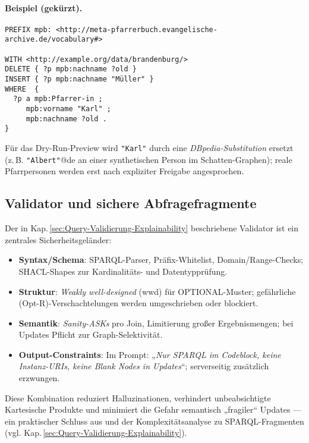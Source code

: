 \paragraph{Beispiel (gekürzt).}
\begin{lstlisting}[language=SPARQL,caption={Graph-selektives Update mit Preview-geeigneter WHERE-Bindung.},label={lst:privacy-update}]
PREFIX mpb: <http://meta-pfarrerbuch.evangelische-archive.de/vocabulary#>

WITH <http://example.org/data/brandenburg/>
DELETE { ?p mpb:nachname ?old }
INSERT { ?p mpb:nachname "Müller" }
WHERE  {
  ?p a mpb:Pfarrer-in ;
     mpb:vorname "Karl" ;
     mpb:nachname ?old .
}
\end{lstlisting}

Für das Dry-Run-Preview wird \texttt{"Karl"} durch eine \emph{DBpedia-Substitution} ersetzt (z.\,B. \texttt{"Albert"}@de an einer synthetischen Person im Schatten-Graphen); reale Pfarrpersonen werden erst nach expliziter Freigabe angesprochen.

\subsection{Validator und sichere Abfragefragmente}
\label{subsec:validator-privacy}

Der in Kap.\,\ref{sec:Query-Validierung-Explainability} beschriebene Validator ist ein zentrales Sicherheitsgeländer:

\begin{itemize}
  \item \textbf{Syntax/Schema}: SPARQL-Parser, Präfix-Whitelist, Domain/Range-Checks; SHACL-Shapes zur Kardinalitäts- und Datentypprüfung.
  \item \textbf{Struktur}: \emph{Weakly well-designed} (wwd) für OPTIONAL-Muster; gefährliche (Opt-R)-Verschachtelungen werden umgeschrieben oder blockiert. 
  \item \textbf{Semantik}: \emph{Sanity-ASKs} pro Join, Limitierung großer Ergebnismengen; bei Updates Pflicht zur Graph-Selektivität.
  \item \textbf{Output-Constraints}: Im Prompt: „\emph{Nur SPARQL im Codeblock, keine Instanz-URIs, keine Blank Nodes in Updates}“; serverseitig zusätzlich erzwungen.
\end{itemize}

Diese Kombination reduziert Halluzinationen, verhindert unbeabsichtigte Kartesische Produkte und minimiert die Gefahr semantisch „fragiler“ Updates — ein praktischer Schluss aus \cite{kirrane2018access_control_rdf_survey} und der Komplexitätsanalyse zu SPARQL-Fragmenten (vgl. Kap.\,\ref{sec:Query-Validierung-Explainability}).

